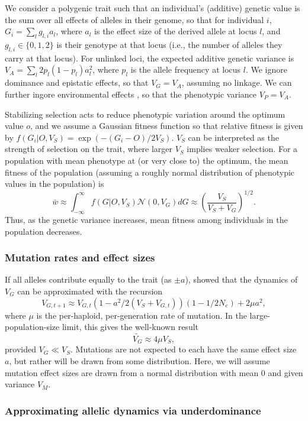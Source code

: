 \documentclass{article}
\begin{document}
We consider a polygenic trait such that an individual's (additive) genetic
value is the sum over all effects of alleles in their genome, so that for
individual $i$, \(G_i = \sum_l g_{l, i} a_l\), where $a_l$ is the effect size
of the derived allele at locus $l$, and \(g_{l,i}\in\{0,1,2\}\) is their
genotype at that locus (i.e., the number of alleles they carry at that locus).
For unlinked loci, the expected additive genetic variance is \(V_A = \sum_l
2p_l(1-p_l)a_l^2\), where $p_l$ is the allele frequency at locus $l$. We ignore
dominance and epistatic effects, so that \(V_G = V_A\), assuming no linkage.
We can further ingore environmental effects \citep{simons2018population}, so
that the phenotypic variance \(V_P=V_A\).

Stabilizing selection acts to reduce phenotypic variation around the optimum
value $o$, and we assume a Gaussian fitness function so that relative fitness
is given by \(f(G_i | O, V_S) = \exp{(-(G_i - O) / 2 V_S)}\). $V_S$ can be
interpreted as the strength of selection on the trait, where larger $V_S$
implies weaker selection. For a population with mean phenotype at (or very
close to) the optimum, the mean fitness of the population (assuming a roughly
normal distribution of phenotypic values in the population) is
\[\bar{w} \approx \int_{-\infty}^\infty f(G | O, V_S) \mathcal{N}(0, V_G) dG
\approx \left(\frac{V_S}{V_S+V_G}\right)^{1/2}.\]
Thus, as the genetic variance increases, mean fitness among individuals in the
population decreases.

\subsubsection*{Mutation rates and effect sizes}

If all alleles contribute equally to the trait (as \(\pm a\)),
\citet{keightley1988quantitative} showed that the dynamics of $V_G$ can be
approximated with the recursion
\[V_{G,t+1} \approx V_{G,t}\left(1-a^2/2(V_S+V_{G,t})\right)
\left(1-1/2N_e\right) + 2 \mu a^2,\]
where $\mu$ is the per-haploid, per-generation rate of mutation. In the
large-population-size limit, this gives the well-known result
\[\tilde{V_G} \approx 4\mu V_S,\] provided \(V_G \ll V_S\).
Mutations are not expected to each have the same effect size $a$, but
rather will be drawn from some distribution. Here, we will assume mutation
effect sizes are drawn from a normal distribution with mean 0 and given
variance $V_M$.

\subsubsection*{Approximating allelic dynamics via underdominance}
\end{document}
